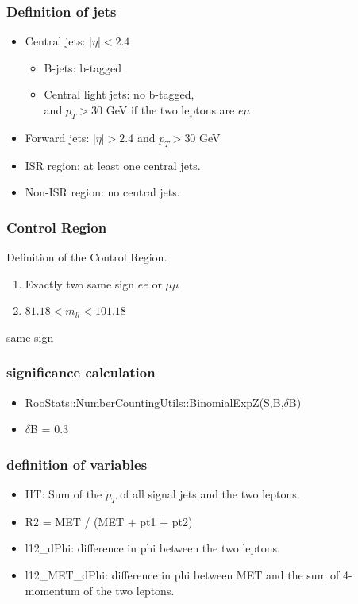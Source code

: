 \documentclass[mathserif,serif]{beamer}
\begin{document}
\begin{frame}
\frametitle{Definition of jets}
\normalsize
\begin{itemize}
\item Central jets: $|\eta|<2.4$
\begin{itemize}
\item B-jets: b-tagged
\item Central light jets: no b-tagged,\\
and $p_T>30$ GeV if the two leptons are $e\mu$
\end{itemize}
\item Forward jets: $|\eta|>2.4$ and $p_T>30$ GeV
\item ISR region: at least one central jets.
\item Non-ISR region: no central jets.
\end{itemize}
\end{frame}

\begin{frame}
\frametitle{Control Region}
Definition of the Control Region.
\begin{enumerate}
\item Exactly two same sign $ee$ or $\mu\mu$
\item $81.18 < m_{ll} < 101.18$
\end{enumerate}
\end{frame}

\begin{frame}
\begin{center}
\huge
same sign
\end{center}
\end{frame}


%

\begin{frame}
\frametitle{significance calculation}
\begin{itemize}
\item RooStats::NumberCountingUtils::BinomialExpZ(S,B,$\delta$B)
\item $\delta$B = 0.3
\end{itemize}
\end{frame}

\begin{frame}
\frametitle{definition of variables}
\normalsize
\begin{itemize}
\item HT: Sum of the $p_T$ of all signal jets and the two leptons.
\item R2 = MET / (MET + pt1 + pt2)
\item l12\_dPhi: difference in phi between the two leptons.
\item l12\_MET\_dPhi: difference in phi between MET and the sum of 4-momentum of the two leptons.
\end{itemize}
\end{frame}
\end{document}
